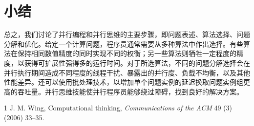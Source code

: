 \section{小结}
\label{sec:algorithm-selection-summary}

总之，我们讨论了并行编程和并行思维的主要步骤，即问题表述、算法选择、问题分解和优化。给定一个计算问题，程序员通常需要从多种算法中作出选择。有些算法在保持相同数值精度的同时实现不同的权衡；另一些算法则牺牲一定程度的精度，以获得可扩展性强得多的运行时间。对于所选算法，不同的问题分解选择会在并行执行期间造成不同程度的线程干扰、暴露出的并行度、负载不均衡，以及其他性能差异。还可以使用批处理技术，以增加单个问题实例的延迟换取问题实例组更高的吞吐量。并行思维技能使并行程序员能够绕过障碍，找到良好的解决方案。

\begin{chapterbibliography}{1}
  J. M. Wing, Computational thinking, \emph{Communications of the ACM} 49 (3) (2006) 33--35.
\end{chapterbibliography}
